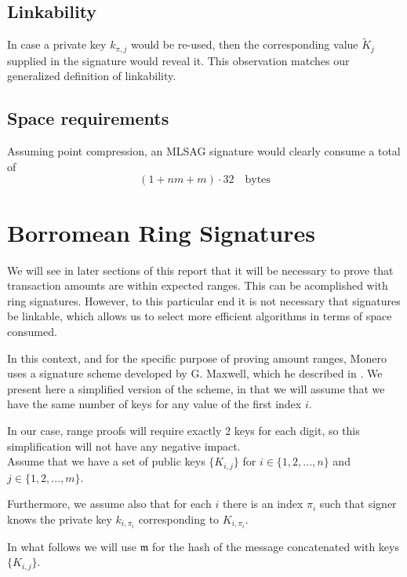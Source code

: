\subsection*{Linkability}

In case a private key \(k_{\pi, j}\) would be re-used, then the corresponding value \(\tilde{K}_j\) supplied in the signature would reveal it.
This observation matches our generalized definition of linkability.


\subsection*{Space requirements}

Assuming point compression, an MLSAG signature would clearly consume a total of 
    \[(1 + n m + m) \cdot 32 \quad \textrm{bytes}\]


\section{Borromean Ring Signatures}
\label{sec:borromean}

We will see in later sections of this report that it will be necessary to prove that transaction amounts are within
expected ranges.
This can be acomplished with ring signatures. 
However, to this particular end it is not necessary that signatures be linkable, which allows us to select more efficient algorithms in terms of space consumed.

In this context, and for the specific purpose of proving amount ranges, Monero uses a signature scheme developed by G. Maxwell, which he described  in \cite{Signatures2015BorromeanRS}.
We present here a simplified version of the scheme, in that we will assume that
we have the same number of keys for any value of the first index \(i\).

In our case, range proofs will require exactly 2 keys for each digit, so this simplification
will not have any negative impact. 
\\


Assume that we have a set of public keys \(\{ K_{i,j} \} \) for \(i \in \{1, 2, ..., n\}\) and \(j \in \{1, 2, ..., m\}\).

Furthermore, we assume also that for each \(i\) there is an index \(\pi_i\) such that signer knows the private key \(k_{i,\pi_i}\) corresponding to \(K_{i,\pi_i}\).

In what follows we will use \(\mathfrak{m}\) for the hash of the message concatenated with keys
\(\{ K_{i,j} \} \).

